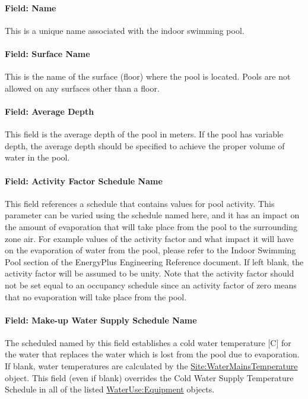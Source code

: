 \paragraph{Field: Name}\label{field-name-7-008}

This is a unique name associated with the indoor swimming pool.

\paragraph{Field: Surface Name}\label{field-surface-name-1-000}

This is the name of the surface (floor) where the pool is located. Pools are not allowed on any surfaces other than a floor.

\paragraph{Field: Average Depth}\label{field-average-depth}

This field is the average depth of the pool in meters. If the pool has variable depth, the average depth should be specified to achieve the proper volume of water in the pool.

\paragraph{Field: Activity Factor Schedule Name}\label{field-activity-factor-schedule-name}

This field references a schedule that contains values for pool activity. This parameter can be varied using the schedule named here, and it has an impact on the amount of evaporation that will take place from the pool to the surrounding zone air. For example values of the activity factor and what impact it will have on the evaporation of water from the pool, please refer to the Indoor Swimming Pool section of the EnergyPlus Engineering Reference document. If left blank, the activity factor will be assumed to be unity. Note that the activity factor should not be set equal to an occupancy schedule since an activity factor of zero means that no evaporation will take place from the pool.

\paragraph{Field: Make-up Water Supply Schedule Name}\label{field-make-up-water-supply-schedule-name}

The scheduled named by this field establishes a cold water temperature {[}C{]} for the water that replaces the water which is lost from the pool due to evaporation. If blank, water temperatures are calculated by the \hyperref[sitewatermainstemperature]{Site:WaterMainsTemperature} object. This field (even if blank) overrides the Cold Water Supply Temperature Schedule in all of the listed \hyperref[wateruseequipment]{WaterUse:Equipment} objects.

